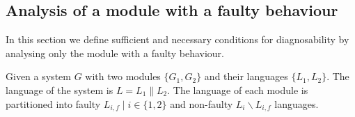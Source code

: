 \documentclass[a4paper, 10pt, conference]{ieeeconf} \IEEEoverridecommandlockouts
\begin{document}
\subsection{Analysis of a module with a faulty behaviour}
In this section we define sufficient and necessary conditions for diagnosability
by analysing only the module with a faulty behaviour.

Given a system $G$ with two modules $\{G_1, G_2\}$ and
their languages $\{L_1, L_2\}$. The language of the system is $L = L_1 \parallel
L_2$. 
The language of each module is partitioned into faulty $L_{i,f}\mid i\in
\{1,2\}$ and non-faulty $L_i\backslash L_{i,f}$ languages.

\end{document}
